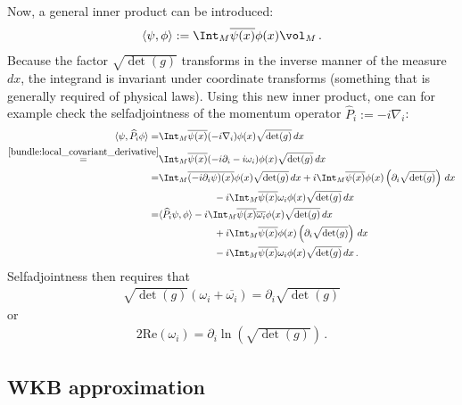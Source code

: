     Now, a general inner product can be introduced:
    \begin{gather}
        \langle\psi,\phi\rangle := \Int_M\overline{\psi(x)}\phi(x)\vol_M\,.
    \end{gather}
    Because the factor $\sqrt{\det(g)}$ transforms in the inverse manner of the measure $dx$, the integrand is invariant under coordinate transforms (something that is generally required of physical laws). Using this new inner product, one can for example check the selfadjointness of the momentum operator $\widehat{P}_i := -i\nabla_i$:
    \begin{align*}
        \langle\psi,\widehat{P}_i\phi\rangle = &\Int_M\overline{\psi(x)}(-i\nabla_i)\phi(x)\sqrt{\det(g)}\,dx\\
        \overset{\cref{bundle:local_covariant_derivative}}{=} &\Int_M\overline{\psi(x)}(-i\partial_i - i\omega_i)\phi(x)\sqrt{\det(g)}\,dx\\
        = &\Int_M\overline{(-i\partial_i\psi)(x)}\phi(x)\sqrt{\det(g)}\,dx+i\Int_M\overline{\psi(x)}\phi(x)\left(\partial_i\sqrt{\det(g)}\right)\,dx\\
            &\hspace{2cm} -i\Int_M\overline{\psi(x)}\omega_i\phi(x)\sqrt{\det(g)}\,dx\\
        = &\langle\widehat{P}_i\psi,\phi\rangle -i\Int_M\overline{\psi(x)}\overline{\omega_i}\phi(x)\sqrt{\det(g)}\,dx\\
            &\hspace{2cm} + i\Int_M\overline{\psi(x)}\phi(x)\left(\partial_i\sqrt{\det(g)}\right)\,dx\\
            &\hspace{2cm} -i\Int_M\overline{\psi(x)}\omega_i\phi(x)\sqrt{\det(g)}\,dx\,.
    \end{align*}
    Selfadjointness then requires that
    \begin{gather}
        \sqrt{\det(g)}(\omega_i + \overline{\omega_i}) = \partial_i\sqrt{\det(g)}
    \end{gather}
    or
    \begin{gather}
        2\mathrm{Re}(\omega_i) = \partial_i\ln\left(\sqrt{\det(g)}\right)\,.
    \end{gather}
    

\subsection{WKB approximation}\label{section:curved_wkb}

